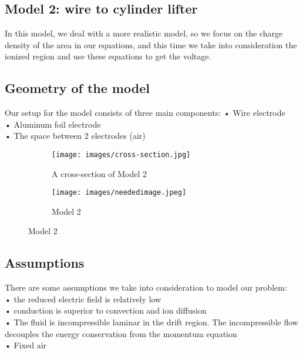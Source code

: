 \subsection*{Model 2: wire to cylinder lifter}
\hspace{\parindent}In this model, we deal with a more realistic model, so we focus on the charge density of the area in our equations, and this time we take into consideration the ionized region and use these equations to get the voltage.
\subsection*{Geometry of the model}
Our setup for the model consists of three main components:
•	Wire electrode\\
•	Aluminum foil electrode\\
•	The space between 2 electrodes (air)\\









\begin{figure}[ht]
    \centering
    \begin{subfigure}{.5\textwidth}
      \centering
      \texttt{[image: images/cross-section.jpg]}
      \caption{A cross-section of Model 2}
    \end{subfigure}%
    \begin{subfigure}{.5\textwidth}
      \centering
      \texttt{[image: images/neededimage.jpeg]}
      \caption{ Model 2\cite{Elsalakawy}}
    \end{subfigure}
      \label{patents}
\end{figure}%





\subsection*{Assumptions}
There are some assumptions we take into consideration to model our problem:\\
•	the reduced electric field is   relatively low\\
•	conduction is superior to convection and ion diffusion\\
•	The fluid is incompressible laminar in the drift region. The incompressible flow decouples the energy conservation from the momentum equation\\
•	Fixed air \\
